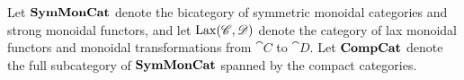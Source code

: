 Let $\mathbf{SymMonCat}$ denote the bicategory of symmetric monoidal categories and strong monoidal functors, and let $\operatorname{Lax}(\mathscr{C},\mathscr{D})$ denote the category of lax monoidal functors and monoidal transformations from $\cat{C}$ to $\cat{D}$. Let $\mathbf{CompCat}$ denote the full subcategory of $\mathbf{SymMonCat}$ spanned by the compact categories.


